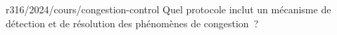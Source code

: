 \begin{question}{r316/2024/cours/congestion-control}
  Quel protocole inclut un mécanisme de détection et de résolution
  des phénomènes de congestion~?
  \begin{reponses}
    \lastchoices
  \end{reponses}
\end{question}
